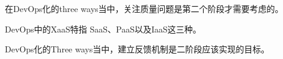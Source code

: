 \begin{problem}
    在DevOps化的three ways当中，关注质量问题是第二个阶段才需要考虑的。
\end{problem}



\begin{problem}
    DevOps中的XaaS特指 SaaS、PaaS以及IaaS这三种。
\end{problem}



\begin{problem}
    DevOps化的Three ways当中，建立反馈机制是二阶段应该实现的目标。
\end{problem}

